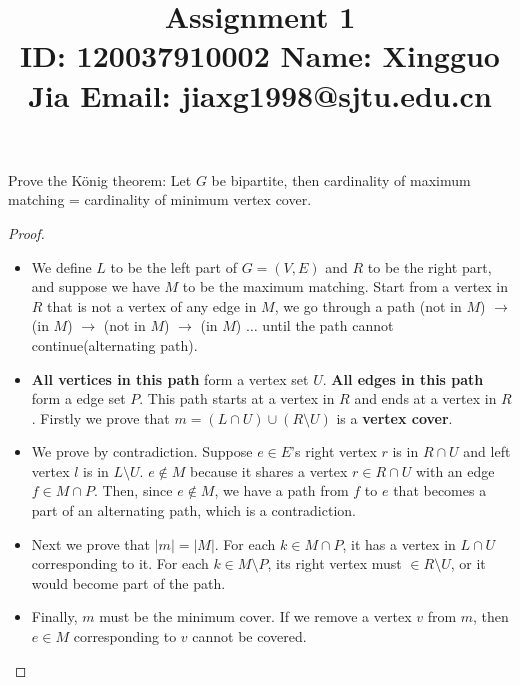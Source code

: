 \documentclass{article}
\title{{\bf Assignment 1} \\ {\large ID: 120037910002 } {\large Name: Xingguo Jia } {\large Email: jiaxg1998@sjtu.edu.cn}}
\author{}
\date{}
\newcounter{exercise}
\newcommand{\<}{
    \langle}
\renewcommand{\>}{
    \rangle}
\begin{document}
\maketitle


{\large





\begin{exercise}
Prove the K\"onig theorem: Let $G$ be bipartite, then cardinality of maximum matching = cardinality of minimum vertex cover.

\end{exercise}
\begin{proof} 
    \leavevmode\newline
\begin{itemize}

\item We define $L$ to be the left part of $G=(V,E)$ and $R$ to be the right part, and suppose we have $M$ to be the maximum matching. Start from a vertex in $R$ that is not a vertex of any edge in $M$, we go through a path (not in $M$) $\rightarrow$ (in $M$) $\rightarrow$  (not in $M$) $\rightarrow$ (in $M$) $\ldots$ until the path cannot continue(alternating path). 

\item \textbf{All vertices in this path } form a vertex set $U$. \textbf{All edges in this path} form a edge set $P$. This path starts at a vertex in $R$ and ends at a vertex in $R$. Firstly we prove that $m=(L \cap U) \cup (R \setminus U)$ is a \textbf{vertex cover}.

\item We prove by contradiction. Suppose $e \in E$'s right vertex $r$ is in $R\cap U$ and left vertex $l$ is in $L\setminus U$. $e\notin M$ because it shares a vertex $r\in R\cap U$ with an edge $f\in M \cap P$. Then, since $e \notin M$, we have a path from $f$ to $e$ that becomes a part of an alternating path, which is a contradiction.

\item Next we prove that $|m| = |M|$. For each $k \in M \cap P$, it has a vertex in $L\cap U$ corresponding to it. For each $k \in M \setminus P$, its right vertex must $\in R \setminus U$, or it would become part of the path.

\item Finally, $m$ must be the minimum cover. If we remove a vertex $v$ from $m$, then $e \in M$ corresponding to $v$ cannot be covered. 
\end{itemize}
\end{proof}


}
\end{document}
